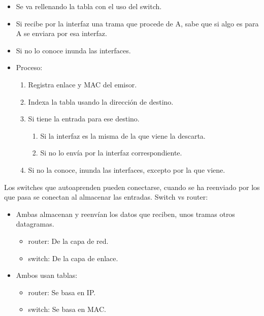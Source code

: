 \documentclass[12pt, twoside, openright]{report} %
\begin{document}
\begin{itemize}
	\item Se va rellenando la tabla con el uso del switch.
	\item Si recibe por la interfaz una trama que procede de A, sabe que
	      si algo es para A se enviara por esa interfaz.
	\item Si no lo conoce inunda las interfaces.
	\item Proceso:

	      \begin{enumerate}
		      \item Registra enlace y MAC del emisor.
		      \item Indexa la tabla usando la dirección de destino.
		      \item Si tiene la entrada para ese destino.

		            \begin{enumerate}
			            \item Si la interfaz es la misma de la que viene la descarta.
			            \item Si no lo envía por la interfaz correspondiente.
		            \end{enumerate}
		      \item Si no la conoce, inunda las interfaces, excepto por la que
		            viene.
	      \end{enumerate}
\end{itemize}

Los switches que autoaprenden pueden conectarse, cuando se ha
reenviado por los que pasa se conectan al almacenar las entradas.
Switch vs router:

\begin{itemize}
	\item Ambas almacenan y reenvían los datos que reciben, unos tramas
	      otros datagramas.

	      \begin{itemize}
		      \item router: De la capa de red.
		      \item switch: De la capa de enlace.
	      \end{itemize}
	\item Ambos usan tablas:

	      \begin{itemize}
		      \item router: Se basa en IP.
		      \item switch: Se basa en MAC.
	      \end{itemize}
\end{itemize}
\pagebreak
\end{document}
